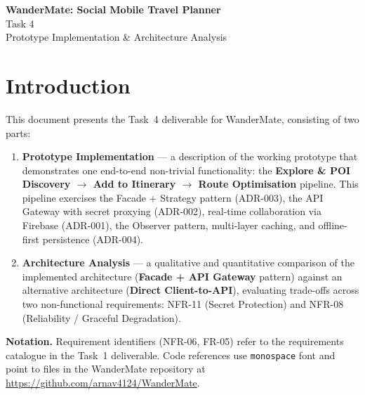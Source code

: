\documentclass[12pt, a4paper]{article}
\newcommand{\code}[1]{\texttt{\small #1}}
\newcommand{\reqid}[1]{\textsc{\small #1}}
\begin{document}
\thispagestyle{empty}

\begin{center}
  {\LARGE\bfseries WanderMate: Social Mobile Travel Planner}\\[0.8em]
  {\large Task 4}\\[0.4em]
  {\large Prototype Implementation \& Architecture Analysis}
\end{center}

\tableofcontents
\newpage

\section{Introduction}

This document presents the Task~4 deliverable for WanderMate, consisting of two parts:

\begin{enumerate}
  \item \textbf{Prototype Implementation} --- a description of the working prototype that demonstrates one end-to-end non-trivial functionality: the \textbf{Explore \& POI Discovery $\to$ Add to Itinerary $\to$ Route Optimisation} pipeline. This pipeline exercises the Facade + Strategy pattern (ADR-003), the API Gateway with secret proxying (ADR-002), real-time collaboration via Firebase (ADR-001), the Observer pattern, multi-layer caching, and offline-first persistence (ADR-004).

  \item \textbf{Architecture Analysis} --- a qualitative and quantitative comparison of the implemented architecture (\textbf{Facade + API Gateway} pattern) against an alternative architecture (\textbf{Direct Client-to-API}), evaluating trade-offs across two non-functional requirements: \reqid{NFR-11} (Secret Protection) and \reqid{NFR-08} (Reliability / Graceful Degradation).
\end{enumerate}

\begin{tcolorbox}[notebox]
  \textbf{Notation.} Requirement identifiers (\reqid{NFR-06}, \reqid{FR-05}) refer to the requirements catalogue in the Task~1 deliverable. Code references use \code{monospace} font and point to files in the WanderMate repository at \url{https://github.com/arnav4124/WanderMate}.
\end{tcolorbox}
\end{document}
